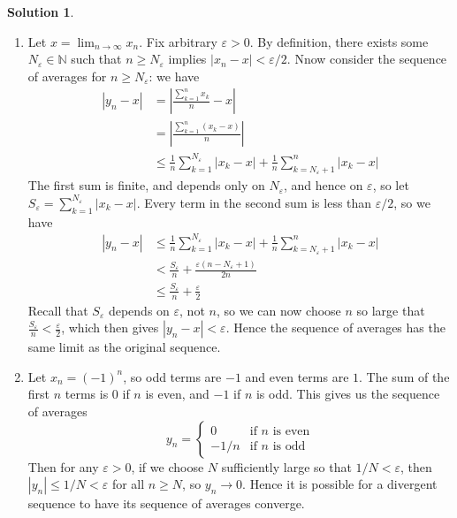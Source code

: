 \documentclass[12pt]{article}
\theoremstyle{definition}
\theoremstyle{definition}
\newtheorem*{soln}{Solution}
\newcommand{\N}{\mathbb{N}}
\begin{document}
\begin{soln}
\begin{enumerate}[label=(\alph*)]
\item Let $x=\lim_{n\to\infty} x_n$. Fix arbitrary $\varepsilon>0$. By definition, there exists some $N_\varepsilon\in\N$ such that $n\geq N_\varepsilon$ implies $|x_n-x|<\varepsilon/2$. Nnow consider the sequence of averages for $n\geq N_\varepsilon$: we have
\begin{align*}
|y_n-x| &= \left|\frac{\sum_{k=1}^n x_k}{n}-x\right| \tag{definition of the average $y_n$}\\
&= \left|\frac{\sum_{k=1}^n (x_k-x)}{n}\right| \tag{moving $x$ inside the sum}\\
&\leq \frac{1}{n}\sum_{k=1}^{N_\varepsilon} |x_k-x| +\frac{1}{n} \sum_{k=N_\varepsilon+1}^n |x_k-x| \tag{using the triangle inequality and taking $1/n$ out of the sums.}
\end{align*}
The first sum is finite, and depends only on $N_\varepsilon$, and hence on $\varepsilon$, so let $S_\varepsilon=\sum_{k=1}^{N_\varepsilon} |x_k-x|$. Every term in the second sum is less than $\varepsilon/2$, so we have
\begin{align*}
|y_n-x| &\leq \frac{1}{n}\sum_{k=1}^{N_\varepsilon} |x_k-x| +\frac{1}{n} \sum_{k=N_\varepsilon+1}^n |x_k-x| \\
&< \frac{S_\varepsilon}{n}+\frac{\varepsilon(n-N_\varepsilon+1)}{2n} \\
&\leq \frac{S_{\varepsilon}}{n}+\frac{\varepsilon}{2} \tag{since $n\geq N_\varepsilon$, so $n-N_\varepsilon+1\leq n$.}
\end{align*}
Recall that $S_\varepsilon$ depends on $\varepsilon$, not $n$, so we can now choose $n$ so large that $\frac{S_\varepsilon}{n}<\frac{\varepsilon}{2}$, which then gives $|y_n-x|<\varepsilon$. Hence the sequence of averages has the same limit as the original sequence.

\item Let $x_n=(-1)^n$, so odd terms are $-1$ and even terms are $1$. The sum of the first $n$ terms is $0$ if $n$ is even, and $-1$ if $n$ is odd. This gives us the sequence of averages
\[y_n = \begin{cases} 0 &\text{if $n$ is even} \\ -1/n &\text{if $n$ is odd}\end{cases}\]
Then for any $\varepsilon>0$, if we choose $N$ sufficiently large so that $1/N<\varepsilon$, then $|y_n|\leq 1/N<\varepsilon$ for all $n\geq N$, so $y_n\to 0$. Hence it is possible for a divergent sequence to have its sequence of averages converge.
\end{enumerate}
\end{soln}
\end{document}
